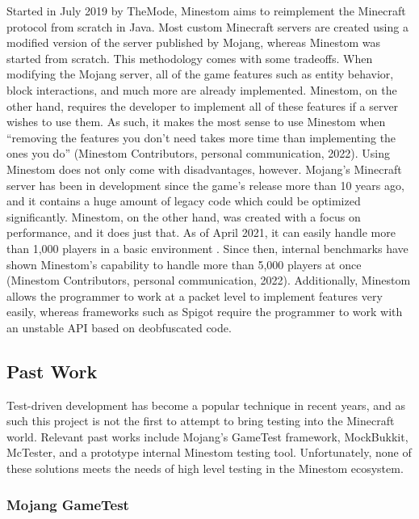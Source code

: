 \documentclass{article}
\begin{document}
\begin{onehalfspacing}
Started in July 2019 by TheMode, Minestom aims to reimplement the
Minecraft protocol from scratch in Java. Most custom Minecraft servers
are created using a modified version of the server published by Mojang,
whereas Minestom was started from scratch. This methodology comes with
some tradeoffs. When modifying the Mojang server, all of the game
features such as entity behavior, block interactions, and much more are
already implemented. Minestom, on the other hand, requires the developer
to implement all of these features if a server wishes to use them. As
such, it makes the most sense to use Minestom when ``removing the
features you don't need takes more time than implementing the ones you
do'' (Minestom Contributors, personal communication, 2022). Using
Minestom does not only come with disadvantages, however. Mojang's
Minecraft server has been in development since the game's release more
than 10 years ago, and it contains a huge amount of legacy code which
could be optimized significantly. Minestom, on the other hand, was
created with a focus on performance, and it does just that. As of April
2021, it can easily handle more than 1,000 players in a basic
environment \parencite{minestom1500players}.
Since then, internal benchmarks have shown
Minestom's capability to handle more than 5,000 players at once
(Minestom Contributors, personal communication, 2022). Additionally,
Minestom allows the programmer to work at a packet level to implement
features very easily, whereas frameworks such as Spigot require the
programmer to work with an unstable API based on deobfuscated code.

\subsection{Past Work}

Test-driven development has become a popular technique in recent years,
and as such this project is not the first to attempt to bring testing
into the Minecraft world. Relevant past works include Mojang's GameTest
framework, MockBukkit, McTester, and a prototype internal Minestom
testing tool. Unfortunately, none of these solutions meets the needs of
high level testing in the Minestom ecosystem.

\subsubsection{Mojang GameTest}


\end{onehalfspacing}
\end{document}
